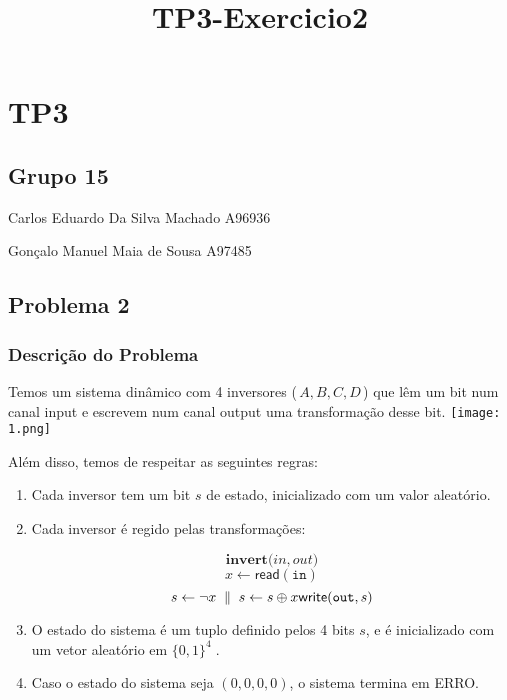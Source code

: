 \documentclass[11pt]{article}
\title{TP3-Exercicio2}
\begin{document}
    
    \maketitle
    
    

    
    \hypertarget{tp3}{%
\section{TP3}\label{tp3}}

\hypertarget{grupo-15}{%
\subsection{Grupo 15}\label{grupo-15}}

Carlos Eduardo Da Silva Machado A96936

Gonçalo Manuel Maia de Sousa A97485

    \hypertarget{problema-2}{%
\subsection{Problema 2}\label{problema-2}}

    \hypertarget{descriuxe7uxe3o-do-problema}{%
\subsubsection{Descrição do
Problema}\label{descriuxe7uxe3o-do-problema}}

Temos um sistema dinâmico com 4 inversores (\(\,A, B, C, D\,\)) que lêm
um bit num canal input e escrevem num canal output uma transformação
desse bit.
\texttt{[image: 1.png]}

Além disso, temos de respeitar as seguintes regras:

\begin{enumerate}
\def\labelenumi{\arabic{enumi}.}
\item
  Cada inversor tem um bit \(s\) de estado, inicializado com um valor
  aleatório.
\item
  Cada inversor é regido pelas transformações:

  \[\mathbf{invert}\mathtt(in,out)\]
  \[x \gets \mathsf{read}(\mathtt{in})\]
  \[s \gets \neg x\;\;\|\;\; s\gets s\oplus x  \\            
                      \mathsf{write}(\mathtt{out},s)\]
\item
  O estado do sistema é um tuplo definido pelos 4 bits \(s\), e é
  inicializado com um vetor aleatório em \(\{0,1\}^4\;\).
\item
  Caso o estado do sistema seja \((0,0,0,0)\), o sistema termina em
  ERRO.
\end{enumerate}
\end{document}
